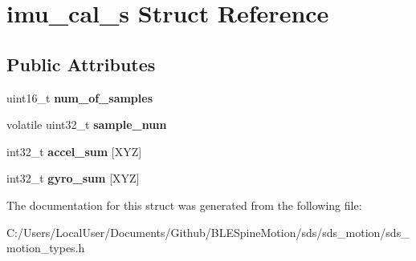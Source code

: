 \hypertarget{structimu__cal__s}{}\section{imu\+\_\+cal\+\_\+s Struct Reference}
\label{structimu__cal__s}
\subsection*{Public Attributes}
\begin{DoxyCompactItemize}
\item 
\mbox{\label{structimu__cal__s_a51867f9463f318280123a70a100acb5f}} 
uint16\+\_\+t {\bfseries num\+\_\+of\+\_\+samples}
\item 
\mbox{\label{structimu__cal__s_ad50b226bdde01c5e9d31c80d9258b246}} 
volatile uint32\+\_\+t {\bfseries sample\+\_\+num}
\item 
\mbox{\label{structimu__cal__s_a76147d8df78a58e3f8e0f14dc45b53a6}} 
int32\+\_\+t {\bfseries accel\+\_\+sum} \mbox{[}X\+YZ\mbox{]}
\item 
\mbox{\label{structimu__cal__s_afbc7a353e5b9b689c00c9ec6425f8ff5}} 
int32\+\_\+t {\bfseries gyro\+\_\+sum} \mbox{[}X\+YZ\mbox{]}
\end{DoxyCompactItemize}


The documentation for this struct was generated from the following file\+:\begin{DoxyCompactItemize}
\item 
C\+:/\+Users/\+Local\+User/\+Documents/\+Github/\+B\+L\+E\+Spine\+Motion/sds/sds\+\_\+motion/sds\+\_\+motion\+\_\+types.\+h\end{DoxyCompactItemize}
